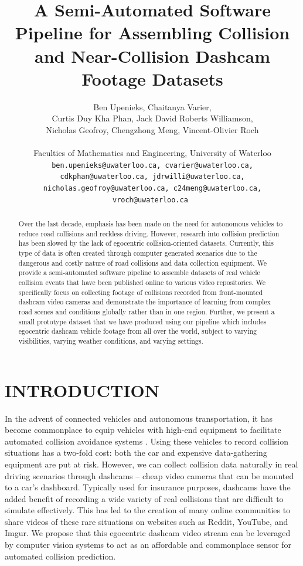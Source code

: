 \documentclass[letterpaper, 10 pt, conference]{ieeeconf}
\title{\LARGE \bf
A Semi-Automated Software Pipeline for Assembling Collision and Near-Collision Dashcam Footage Datasets
}
\author{
         Ben Upenieks, Chaitanya Varier,\\
         Curtis Duy Kha Phan, Jack David Roberts Williamson,\\
         Nicholas Geofroy, Chengzhong Meng, Vincent-Olivier Roch\\
         \\
         Faculties of Mathematics and Engineering, University of Waterloo\\
         \tt\small ben.upenieks@uwaterloo.ca, cvarier@uwaterloo.ca,
         \\ \tt\small cdkphan@uwaterloo.ca, jdrwilli@uwaterloo.ca,
         \\ \tt\small nicholas.geofroy@uwaterloo.ca, c24meng@uwaterloo.ca, vroch@uwaterloo.ca
}
\begin{document}
\maketitle
\thispagestyle{empty}
\pagestyle{empty}


\begin{abstract}

Over the last decade, emphasis has been made on the need for autonomous vehicles to reduce road collisions and reckless driving. However, research into collision prediction has been slowed by the lack of egocentric collision-oriented datasets. Currently, this type of data is often created through computer generated scenarios \cite{Kim_Lee_Hwang_Suh_2019} due to the dangerous and costly nature of road collisions and data collection equipment. We provide a semi-automated software pipeline to assemble datasets of real vehicle collision events that have been published online to various video repositories. We specifically focus on collecting footage of collisions recorded from front-mounted dashcam video cameras and demonstrate the importance of learning from complex road scenes and conditions globally rather than in one region. Further, we present a small prototype dataset that we have produced using our pipeline which includes egocentric dashcam vehicle footage from all over the world, subject to varying visibilities, varying weather conditions, and varying settings.

\end{abstract}

\section{INTRODUCTION}

In the advent of connected vehicles and autonomous transportation, it has become commonplace to equip vehicles with high-end equipment to facilitate automated collision avoidance systems \cite{Perumal2020LidarBI}.
Using these vehicles to record collision situations has a two-fold cost: both the car and expensive data-gathering equipment are put at risk.
However, we can collect collision data naturally in real driving scenarios through dashcams -- cheap video cameras that can be mounted to a car's dashboard.
Typically used for insurance purposes, dashcams have the added benefit of recording a wide variety of real collisions that are difficult to simulate effectively.
This has led to the creation of many online communities to share videos of these rare situations on websites such as Reddit, YouTube, and Imgur.
We propose that this egocentric dashcam video stream can be leveraged by computer vision systems to act as an affordable and commonplace sensor for automated collision prediction.
\end{document}
